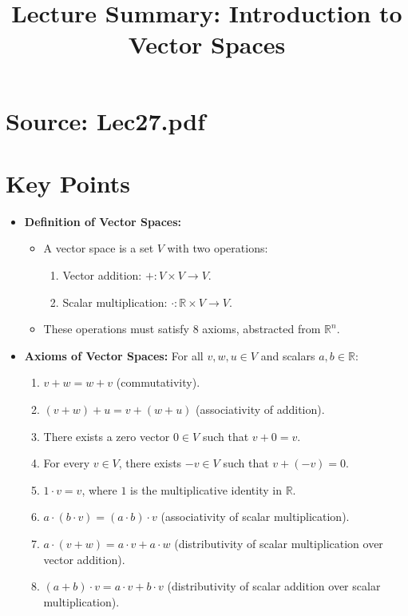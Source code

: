 \documentclass{article}
\title{Lecture Summary: Introduction to Vector Spaces}
\author{}
\date{}
\begin{document}
\maketitle

\section*{Source: Lec27.pdf}

\section*{Key Points}

\begin{itemize}
  \item \textbf{Definition of Vector Spaces:}
    \begin{itemize}
      \item A vector space is a set $V$ with two operations:
        \begin{enumerate}
          \item Vector addition: $+ : V \times V \to V$.
          \item Scalar multiplication: $\cdot : \mathbb{R} \times V \to V$.
        \end{enumerate}
      \item These operations must satisfy 8 axioms, abstracted from $\mathbb{R}^n$.
    \end{itemize}

  \item \textbf{Axioms of Vector Spaces:}
    For all $v, w, u \in V$ and scalars $a, b \in \mathbb{R}$:
    \begin{enumerate}
      \item $v + w = w + v$ (commutativity).
      \item $(v + w) + u = v + (w + u)$ (associativity of addition).
      \item There exists a zero vector $0 \in V$ such that $v + 0 = v$.
      \item For every $v \in V$, there exists $-v \in V$ such that $v + (-v) = 0$.
      \item $1 \cdot v = v$, where $1$ is the multiplicative identity in $\mathbb{R}$.
      \item $a \cdot (b \cdot v) = (a \cdot b) \cdot v$ (associativity of scalar multiplication).
      \item $a \cdot (v + w) = a \cdot v + a \cdot w$ (distributivity of scalar multiplication over vector addition).
      \item $(a + b) \cdot v = a \cdot v + b \cdot v$ (distributivity of scalar addition over scalar multiplication).
    \end{enumerate}


\end{itemize}
\end{document}
